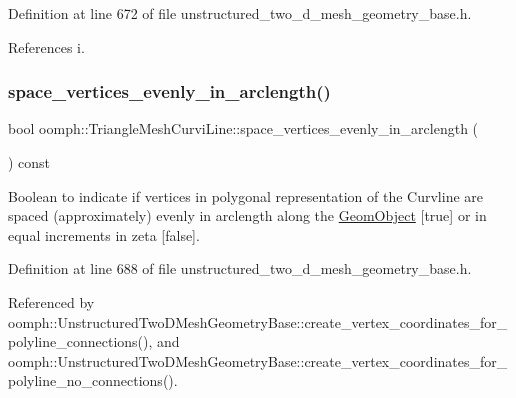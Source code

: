 Definition at line 672 of file unstructured\+\_\+two\+\_\+d\+\_\+mesh\+\_\+geometry\+\_\+base.\+h.



References i.

\mbox{\label{classoomph_1_1TriangleMeshCurviLine_aeebdc2c7b0bfe0e577ba1b6c93b38895}} 
\subsubsection{\texorpdfstring{space\+\_\+vertices\+\_\+evenly\+\_\+in\+\_\+arclength()}{space\_vertices\_evenly\_in\_arclength()}}
{\footnotesize\ttfamily bool oomph\+::\+Triangle\+Mesh\+Curvi\+Line\+::space\+\_\+vertices\+\_\+evenly\+\_\+in\+\_\+arclength (\begin{DoxyParamCaption}{ }\end{DoxyParamCaption}) const\hspace{0.3cm}{\ttfamily [inline]}}



Boolean to indicate if vertices in polygonal representation of the Curvline are spaced (approximately) evenly in arclength along the \hyperlink{classoomph_1_1GeomObject}{Geom\+Object} \mbox{[}true\mbox{]} or in equal increments in zeta \mbox{[}false\mbox{]}. 



Definition at line 688 of file unstructured\+\_\+two\+\_\+d\+\_\+mesh\+\_\+geometry\+\_\+base.\+h.



Referenced by oomph\+::\+Unstructured\+Two\+D\+Mesh\+Geometry\+Base\+::create\+\_\+vertex\+\_\+coordinates\+\_\+for\+\_\+polyline\+\_\+connections(), and oomph\+::\+Unstructured\+Two\+D\+Mesh\+Geometry\+Base\+::create\+\_\+vertex\+\_\+coordinates\+\_\+for\+\_\+polyline\+\_\+no\+\_\+connections().

\mbox{\label{classoomph_1_1TriangleMeshCurviLine_acecf95595d14b777bf6ac2ddd9327f8b}} 
